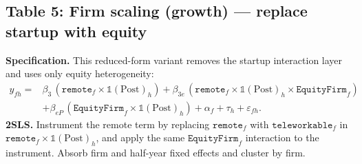 \documentclass{article}
\newcommand{\cleanedresultsdir}{../../results/cleaned/tex}
\newcommand{\TableInput}[2][\linewidth]{}
\newcommand{\FloatNote}[1]{%
  \begingroup
    \captionsetup{style=noteflush}%
    \caption*{\textit{Notes:}~#1}%
  \endgroup
}
\begin{document}
\subsection*{Table 5: Firm scaling (growth) --- replace startup with equity}
\noindent \textbf{Specification.} This reduced-form variant removes the startup interaction layer and uses only equity heterogeneity:
\begin{equation*}
\begin{aligned}
  y_{fh} ={}&
  \beta_3\,(\texttt{remote}_f\times \mathds{1}(\text{Post})_h)
  + \beta_{3e}\,(\texttt{remote}_f\times \mathds{1}(\text{Post})_h\times \texttt{EquityFirm}_f) \\
  &+ \beta_{eP}\,(\texttt{EquityFirm}_f\times \mathds{1}(\text{Post})_h)
  + \alpha_f + \tau_h + \varepsilon_{fh}.
\end{aligned}
\end{equation*}
\noindent \textbf{2SLS.} Instrument the remote term by replacing $\texttt{remote}_f$ with $\texttt{teleworkable}_f$ in $\texttt{remote}_f\times \mathds{1}(\text{Post})_h$, and apply the same $\texttt{EquityFirm}_f$ interaction to the instrument. Absorb firm and half-year fixed effects and cluster by firm.
\begin{table}[H]\centering
  \caption{Firm scaling: replace startup with equity}
  \TableInput{\cleanedresultsdir/llm_equity_pi_followups_reduced1_firm.tex}
  \FloatNote{Columns report OLS and IV estimates of the reduced-form specification above. The row $\texttt{Remote}\times\mathds{1}(\text{Post})$ is the post remote effect for non-equity firms ($\texttt{EquityFirm}=0$). The interaction row $\texttt{Remote}\times\mathds{1}(\text{Post})\times\texttt{EquityFirm}$ is the \emph{incremental} post remote effect for equity firms relative to non-equity firms. Therefore, the post remote effect for equity firms is the sum of the first two rows. The row $\texttt{EquityFirm}\times\mathds{1}(\text{Post})$ is an additional post-period level shift for equity firms holding remote exposure fixed. ``KP rk Wald F'' is the Kleibergen--Paap rk Wald F statistic (IV only). Standard errors are clustered by firm and reported in parentheses; *, **, *** denote $p<0.10, 0.05, 0.01$.}
\end{table}
\end{document}
